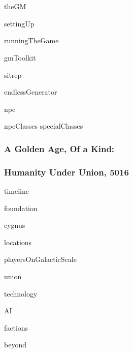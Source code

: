 \documentclass{book}
\begin{document}
\part{}
{theGM}    
\newpage

{settingUp}    
\newpage

{runningTheGame}    
\newpage

{gmToolkit}    
\newpage

{sitrep}    
\newpage

{endlessGenerator}    
\newpage

{npc}    
\newpage

{npcClasses}    
\newpage
{specialClasses}    
\newpage
\section{A Golden Age, Of a Kind:}  
\section{Humanity Under Union, 5016} 
\newpage

{timeline}    
\newpage

{foundation}    
\newpage

{cygnus}    
\newpage

{locations}    
\newpage

{playersOnGalacticScale}    
\newpage

{union}    
\newpage

{technology}    
\newpage

{AI}    
\newpage

{factions}    
\newpage

{beyond}    
\newpage
\end{document}

